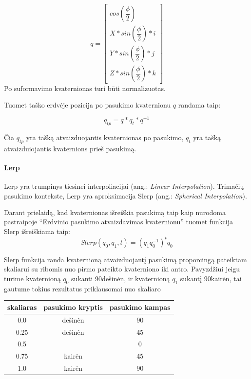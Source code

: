 \documentclass[12pt, a4paper, lithuanian, final]{article}
\begin{document}
\begin{equation}
	q = \left[
		\begin{array}{c}
			cos(\dfrac{\phi}{2})\\
			X * sin(\dfrac{\phi}{2}) * i\\
			Y * sin(\dfrac{\phi}{2}) * j \\
			Z * sin(\dfrac{\phi}{2}) * k
		\end{array}
	\right]
\end{equation}
Po suformavimo kvaternionas turi būti normalizuotas.

Tuomet taško erdvėje pozicija po pasukimo kvaternionu $q$ randama taip:

\begin{equation}
	q_{tp} = q * q_{t} * q^{-1}
\end{equation}

Čia $q_{tp}$ yra tašką atvaizduojantis kvaternionas po pasukimo, $q_{t}$ yra tašką atvaizduiojantis kvaternions prieš pasukimą.



\paragraph{Lerp}

Lerp yra trumpinys tiesinei interpoliacijai (ang.: \textit{Linear Interpolation}).
Trimačių pasukimo kontekste, Lerp yra aproksimacija Slerp (ang.: \textit{Spherical Interpolation}).

Darant prielaidą, kad kvaternionas išreiškia pasukimą taip kaip nurodoma pastraipoje "`Erdvinio pasukimo atvaizdavimas kvaternionu"' tuomet funkcija Slerp išreiškiama taip:
\begin{equation}
	Slerp(q_0, q_1, t) = (q_1 q_0^{-1})^{t}q_0
\end{equation}

Slerp funkcija randa kvaternioną atvaizduojantį pasukimą proporcingą pateiktam skaliarui su ribomis nuo pirmo pateikto kvaterniono iki antro.
Pavyzdžiui jeigu turime kvaternioną $q_0$ sukanti 90\degree dešinėn, ir kvaternioną $q_1$ sukantį 90\degree kairėn, tai gautume tokius rezultatus priklausomai nuo skaliaro

\begin{center}
\begin{tabular}{ | c | c | c | }
	\hline
	\textbf{skaliaras} & \textbf{pasukimo kryptis} & \textbf{pasukimo kampas} \\
	\hline
	0.0 & dešinėn & 90\degree \\
	\hline
	0.25 & dešinėn & 45\degree \\
	\hline
	0.5 & & 0\degree \\
	\hline
	0.75 & kairėn & 45\degree \\
	\hline
	1.0 & kairėn & 90\degree \\
	\hline
\end{tabular}
\end{center}
\end{document}
